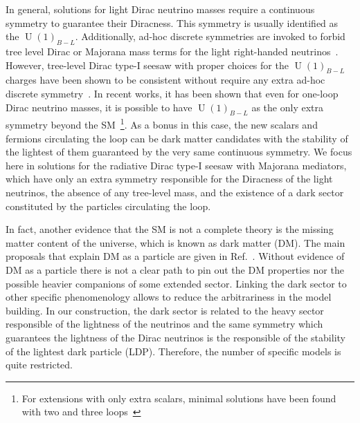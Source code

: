 \documentclass[12pt]{article}
\begin{document}
In general, solutions for light Dirac neutrino masses require a
continuous symmetry to guarantee their Diracness. This symmetry is
usually identified as the $\operatorname{U}(1)_{B-L}$.  Additionally,
ad-hoc discrete symmetries are invoked to forbid tree level Dirac or
Majorana mass terms for the light right-handed
neutrinos~\cite{Roncadelli:1983ty,Han:2018zcn,Wang:2017mcy}. 
However, tree-level Dirac type-I seesaw with proper choices for the
$\operatorname{U}(1)_{B-L}$ charges have been shown to be consistent
without require any extra ad-hoc discrete symmetry~\cite{Ma:2014qra}.
In recent works, it has been shown that even for one-loop Dirac
neutrino masses, it is possible to have $\operatorname{U}(1)_{B-L}$ as
the only extra symmetry beyond the SM~\cite{Calle:2018ovc,Bonilla:2018ynb,Saad:2019bqf}\footnote{
  For extensions with only extra scalars, minimal solutions have been found with two and three loops~\cite{Saad:2019bqf}}.
As a bonus in this case, the new scalars and fermions circulating the
loop can be dark matter candidates with the stability of the lightest
of them guaranteed by the very same continuous symmetry.
We focus here in solutions for the radiative Dirac type-I seesaw with
Majorana mediators, which have only an extra symmetry responsible for the
Diracness of the light neutrinos, the absence of any tree-level
mass, and the existence of a dark sector constituted by the
particles circulating the loop.

In fact, another evidence that the SM is not a complete theory is the
missing matter content of the universe, which is known as dark matter
(DM).
The main proposals that explain DM as a particle are given in
Ref.~\cite{Bertone:2004pz}.
Without evidence of DM as a particle there is not a clear path to pin
out the DM properties nor the possible heavier companions of some
extended sector. 
Linking the dark sector to other specific phenomenology allows to
reduce the arbitrariness in the model building.
In our construction, the dark sector is related to the heavy sector
responsible of the lightness of the neutrinos and the same symmetry
which guarantees the lightness of the Dirac neutrinos is the
responsible of the stability of the lightest dark particle (LDP).
Therefore, the number of specific models is quite restricted.
\end{document}
